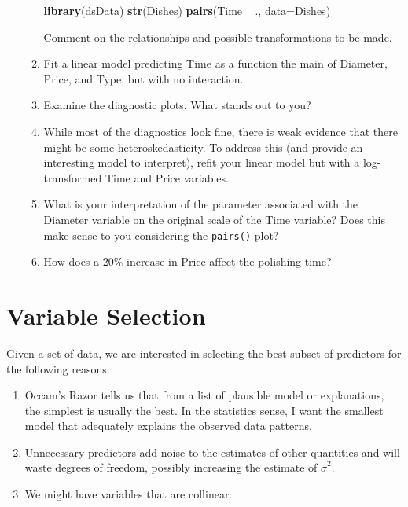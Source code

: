 \documentclass[]{book}
\newenvironment{Shaded}{\begin{snugshade}}{\end{snugshade}}
\newcommand{\KeywordTok}[1]{\textcolor[rgb]{0.13,0.29,0.53}{\textbf{{#1}}}}
\newcommand{\DataTypeTok}[1]{\textcolor[rgb]{0.13,0.29,0.53}{{#1}}}
\newcommand{\StringTok}[1]{\textcolor[rgb]{0.31,0.60,0.02}{{#1}}}
\newcommand{\NormalTok}[1]{{#1}}
\theoremstyle{definition}
\theoremstyle{definition}
\theoremstyle{remark}
\begin{document}
\begin{enumerate}
\begin{enumerate}
\begin{Shaded}
\begin{Highlighting}[]
\KeywordTok{library}\NormalTok{(dsData)}
\KeywordTok{str}\NormalTok{(Dishes)}
\KeywordTok{pairs}\NormalTok{(Time ~}\StringTok{ }\NormalTok{., }\DataTypeTok{data=}\NormalTok{Dishes)}
\end{Highlighting}
\end{Shaded}

    Comment on the relationships and possible transformations to be
    made.
  \item
    Fit a linear model predicting Time as a function the main of
    Diameter, Price, and Type, but with no interaction.
  \item
    Examine the diagnostic plots. What stands out to you?
  \item
    While most of the diagnostics look fine, there is weak evidence that
    there might be some heteroskedasticity. To address this (and provide
    an interesting model to interpret), refit your linear model but with
    a log-transformed Time and Price variables.
  \item
    What is your interpretation of the parameter associated with the
    Diameter variable on the original scale of the Time variable? Does
    this make sense to you considering the \texttt{pairs()} plot?
  \item
    How does a 20\% increase in Price affect the polishing time?
  \end{enumerate}
\end{enumerate}

\chapter{Variable Selection}\label{variable-selection}

Given a set of data, we are interested in selecting the best subset of
predictors for the following reasons:

\begin{enumerate}
\def\labelenumi{\arabic{enumi}.}
\item
  Occam's Razor tells us that from a list of plausible model or
  explanations, the simplest is usually the best. In the statistics
  sense, I want the smallest model that adequately explains the observed
  data patterns.
\item
  Unnecessary predictors add noise to the estimates of other quantities
  and will waste degrees of freedom, possibly increasing the estimate of
  \(\hat{\sigma}^{2}\).
\item
  We might have variables that are collinear.
\end{enumerate}
\end{document}
